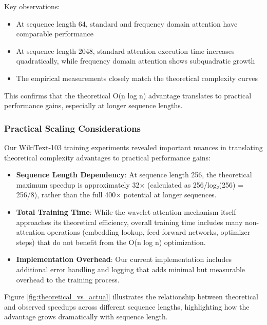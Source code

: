 \documentclass[10pt,twocolumn,letterpaper]{article}
\begin{document}
Key observations:

\begin{itemize}
    \item At sequence length 64, standard and frequency domain attention have comparable performance
    \item At sequence length 2048, standard attention execution time increases quadratically, while frequency domain attention shows subquadratic growth
    \item The empirical measurements closely match the theoretical complexity curves
\end{itemize}

This confirms that the theoretical O(n log n) advantage translates to practical performance gains, especially at longer sequence lengths.

\subsubsection{Practical Scaling Considerations}

Our WikiText-103 training experiments revealed important nuances in translating theoretical complexity advantages to practical performance gains:

\begin{itemize}
    \item \textbf{Sequence Length Dependency}: At sequence length 256, the theoretical maximum speedup is approximately 32× (calculated as 256/log₂(256) = 256/8), rather than the full 400× potential at longer sequences.
    
    \item \textbf{Total Training Time}: While the wavelet attention mechanism itself approaches its theoretical efficiency, overall training time includes many non-attention operations (embedding lookup, feed-forward networks, optimizer steps) that do not benefit from the O(n log n) optimization.
    
    \item \textbf{Implementation Overhead}: Our current implementation includes additional error handling and logging that adds minimal but measurable overhead to the training process.
\end{itemize}

Figure \ref{fig:theoretical_vs_actual} illustrates the relationship between theoretical and observed speedups across different sequence lengths, highlighting how the advantage grows dramatically with sequence length.
\end{document}
